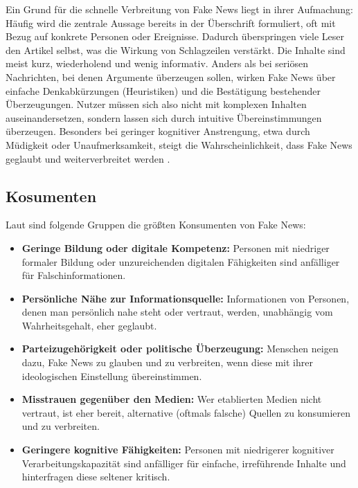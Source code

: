 Ein Grund für die schnelle Verbreitung von Fake News liegt in ihrer Aufmachung: Häufig wird die zentrale Aussage bereits in der Überschrift formuliert, 
oft mit Bezug auf konkrete Personen oder Ereignisse. Dadurch überspringen viele Leser den Artikel selbst, was die Wirkung von Schlagzeilen verstärkt. 
Die Inhalte sind meist kurz, wiederholend und wenig informativ. Anders als bei seriösen Nachrichten, bei denen Argumente überzeugen sollen, wirken Fake News über einfache Denkabkürzungen (Heuristiken) und die Bestätigung bestehender Überzeugungen. 
Nutzer müssen sich also nicht mit komplexen Inhalten auseinandersetzen, sondern lassen sich durch intuitive Übereinstimmungen überzeugen. 
Besonders bei geringer kognitiver Anstrengung, etwa durch Müdigkeit oder Unaufmerksamkeit, steigt die Wahrscheinlichkeit, dass Fake News geglaubt und weiterverbreitet werden \cite{horne2017}.

\subsection{Kosumenten}

Laut \cite{horne2017} sind folgende Gruppen die größten Konsumenten von Fake News:

\begin{itemize}
    \item \textbf{Geringe Bildung oder digitale Kompetenz:} Personen mit niedriger formaler Bildung oder unzureichenden digitalen Fähigkeiten sind anfälliger für Falschinformationen.
    
    \item \textbf{Persönliche Nähe zur Informationsquelle:} Informationen von Personen, denen man persönlich nahe steht oder vertraut, werden, unabhängig vom Wahrheitsgehalt, eher geglaubt.
    
    \item \textbf{Parteizugehörigkeit oder politische Überzeugung:} Menschen neigen dazu, Fake News zu glauben und zu verbreiten, wenn diese mit ihrer ideologischen Einstellung übereinstimmen.
    
    \item \textbf{Misstrauen gegenüber den Medien:} Wer etablierten Medien nicht vertraut, ist eher bereit, alternative (oftmals falsche) Quellen zu konsumieren und zu verbreiten.
    
    \item \textbf{Geringere kognitive Fähigkeiten:} Personen mit niedrigerer kognitiver Verarbeitungskapazität sind anfälliger für einfache, irreführende Inhalte und hinterfragen diese seltener kritisch.
\end{itemize}

